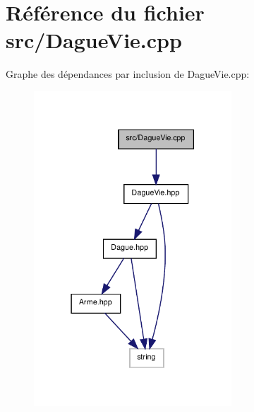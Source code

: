 \section{Référence du fichier src/\-Dague\-Vie.cpp}
\label{_dague_vie_8cpp}
Graphe des dépendances par inclusion de Dague\-Vie.\-cpp\-:\nopagebreak
\begin{figure}[H]
\begin{center}
\leavevmode
\includegraphics[width=210pt]{_dague_vie_8cpp__incl}
\end{center}
\end{figure}
